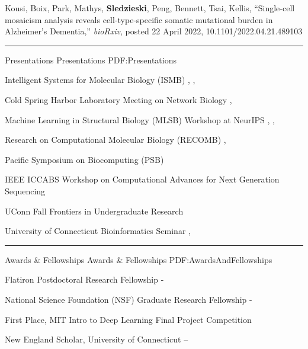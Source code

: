 \documentclass[letterpaper,MMMyyyy,nonstopmode]{simpleresumecv}
\begin{document}
\begin{Body}
\Gap
\NumberedItem{[1]}
{{Kousi, Boix, Park, Mathys, \textbf{Sledzieski}, Peng, Bennett, Tsai, Kellis}, 
``Single-cell mosaicism analysis reveals cell-type-specific somatic mutational burden in Alzheimer’s Dementia,'' 
 \textit{bioRxiv}, posted 22 April 2022, 10.1101/2022.04.21.489103
}



\BigGap
\hrule
\Section
{Presentations}
{Presentations}
{PDF:Presentations}


\Entry
{Intelligent Systems for Molecular Biology (ISMB)}
\hfill
{}, , 
\Gap

\Entry
{Cold Spring Harbor Laboratory Meeting on Network Biology}
\hfill
{}, 
\Gap

\Entry
{Machine Learning in Structural Biology (MLSB) Workshop at NeurIPS}
\hfill
{}, , 
\Gap

\Entry
{Research on Computational Molecular Biology (RECOMB)}
\hfill
{}, 
\Gap

\Entry
{Pacific Symposium on Biocomputing (PSB)}
\hfill
{}
\Gap

\Entry
{IEEE ICCABS Workshop on Computational Advances for Next Generation Sequencing}
\hfill
{}
\Gap

\Entry
{UConn Fall Frontiers in Undergraduate Research}
\hfill
{}
\Gap

\Entry
{University of Connecticut Bioinformatics Seminar}
\hfill
{}, 

\BigGap
\hrule
\Section
{Awards \&\newline
Fellowships}
{Awards \& Fellowships}
{PDF:AwardsAndFellowships}

\Entry
{Flatiron Postdoctoral Research Fellowship}
\hfill
{} - 
\Gap

\Entry
{National Science Foundation (NSF) Graduate Research Fellowship}
\hfill
{} - 
\Gap

\Entry
{First Place, MIT Intro to Deep Learning Final Project Competition}
\hfill
{}
\Gap

\Entry
{New England Scholar, University of Connecticut}
\hfill
{} -- 
\Gap


\end{Body}
\end{document}
